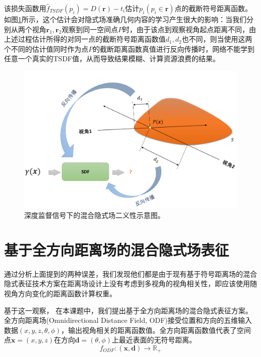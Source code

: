 该损失函数用$\hat{f}_{TSDF}(p_i) = D(\mathbf{r})-t_i$估计$p_i (p_i \in \mathbf{r})$点的截断符号距离函数。如图\ref{fig:omni-nerf depth error}所示，这个估计会对隐式场准确几何内容的学习产生很大的影响：当我们分别从两个视角$\mathbf{r}_1, \mathbf{r}_2$观察到同一空间点$P$时，由于该点到观察视角起点距离不同，由上述过程估计所得的对同一点的截断符号距离函数值$d_1, d_2$也不同，则当使用这两个不同的估计值同时作为点$P$的截断距离函数真值进行反向传播时，网络不能学到任意一个真实的TSDF值，从而导致结果模糊、计算资源浪费的结果。

\begin{figure}[ht]
    \centering
    \includegraphics[width=\textwidth]{undergraduate-thesis/images/omninerf-error1.pdf}
    \caption{深度监督信号下的混合隐式场二义性示意图。}
    \label{fig:omni-nerf depth error}
\end{figure}


\section{基于全方向距离场的混合隐式场表征}
通过分析上面提到的两种误差，我们发现他们都是由于现有基于符号距离场的混合隐式表征技术方案在距离场设计上没有考虑到多视角的视角相关性，即应该使用随视角方向变化的距离函数计算权重。

基于这一观察， 在本课题中，我们提出基于全方向距离场的混合隐式表征方案。全方向距离场(Omnidirectional Distance Field, ODF)接受位置和方向的五维输入数据$(x,y,z,\theta,\phi)$，输出视角相关的距离函数值。全方向距离函数值代表了空间点$\mathbf{x}=(x,y,z)$在方向$\mathbf{d}=(\theta,\phi)$上最近表面的无符号距离。
\begin{equation}
    f_{ODF}: (\mathbf{x},\mathbf{d})\to \mathbb{R}_+
    \label{eq: omninerf-odf function}
\end{equation}

